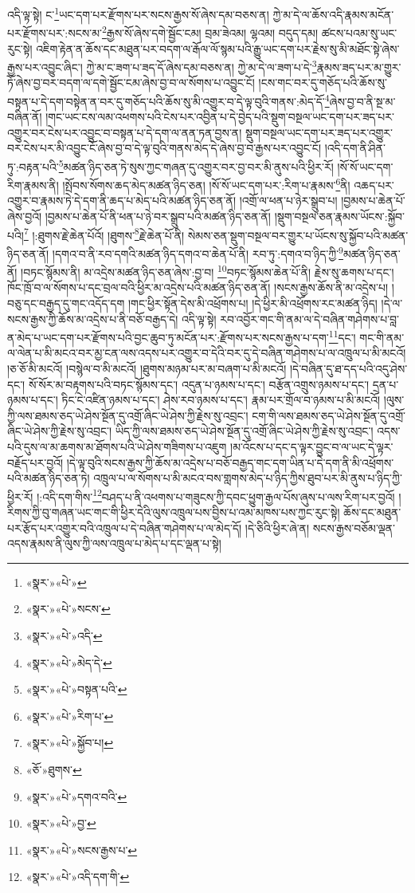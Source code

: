 འདི་ལྟ་སྟེ། ང་\footnote{«སྣར་»«པེ་»}ཡང་དག་པར་རྫོགས་པར་སངས་རྒྱས་སོ་ཞེས་དམ་བཅས་ན། ཀྱེ་མ་དེ་ལ་ཆོས་འདི་རྣམས་མངོན་པར་རྫོགས་པར་:སངས་མ་\footnote{«སྣར་»«པེ་»སངས་}རྒྱས་སོ་ཞེས་དགེ་སྦྱོང་ངམ། བྲམ་ཟེའམ། ལྷའམ། བདུད་དམ། ཚངས་པའམ་སུ་ཡང་རུང་སྟེ། འཇིག་རྟེན་ན་ཆོས་དང་མཐུན་པར་བདག་ལ་རྒོལ་ལོ་སྙམ་པའི་རྒྱུ་ཡང་དག་པར་རྗེས་སུ་མི་མཐོང་སྟེ་ཞེས་རྒྱས་པར་འབྱུང་ཞིང་། ཀྱེ་མ་ང་ཟག་པ་ཟད་དོ་ཞེས་དམ་བཅས་ན། ཀྱེ་མ་དེ་ལ་ཟག་པ་དེ་\footnote{«སྣར་»«པེ་»འདི་}རྣམས་ཟད་པར་མ་གྱུར་ཏོ་ཞེས་བྱ་བར་བདག་ལ་དགེ་སྦྱོང་ངམ་ཞེས་བྱ་བ་ལ་སོགས་པ་འབྱུང་ངོ། །ངས་གང་བར་དུ་གཅོད་པའི་ཆོས་སུ་བསྟན་པ་དེ་དག་བསྟེན་ན་བར་དུ་གཅོད་པའི་ཆོས་སུ་མི་འགྱུར་བ་དེ་ལྟ་བུའི་གནས་:མེད་དོ་\footnote{«སྣར་»«པེ་»མེད་དེ་}ཞེས་བྱ་བ་ནི་སྔ་མ་བཞིན་ནོ། །གང་ཡང་ངས་ལམ་འཕགས་པའི་ངེས་པར་འབྱིན་པ་དེ་བྱེད་པའི་སྡུག་བསྔལ་ཡང་དག་པར་ཟད་པར་འགྱུར་བར་ངེས་པར་འབྱུང་བ་བསྟན་པ་དེ་དག་ལ་ནན་ཏན་བྱས་ན། སྡུག་བསྔལ་ཡང་དག་པར་ཟད་པར་འགྱུར་བར་ངེས་པར་མི་འབྱུང་ངོ་ཞེས་བྱ་བ་དེ་ལྟ་བུའི་གནས་མེད་དེ་ཞེས་བྱ་བ་རྒྱས་པར་འབྱུང་ངོ། །འདི་དག་ནི་ཤིན་ཏུ་:བརྟན་པའི་\footnote{«སྣར་»«པེ་»བསྟན་པའི་}མཚན་ཉིད་ཅན་ཏེ་སུས་ཀྱང་གཞན་དུ་འགྱུར་བར་བྱ་བར་མི་ནུས་པའི་ཕྱིར་རོ། །སོ་སོ་ཡང་དག་རིག་རྣམས་ནི། །སྤོབས་སོགས་ཆད་མེད་མཚན་ཉིད་ཅན། །སོ་སོ་ཡང་དག་པར་:རིག་པ་རྣམས་\footnote{«སྣར་»«པེ་»རིག་པ་}ནི། འཆད་པར་འགྱུར་བ་རྣམས་ཏེ་དེ་དག་ནི་ཆད་པ་མེད་པའི་མཚན་ཉིད་ཅན་ནོ། །འགྲོ་ལ་ཕན་པ་ཉེར་སྒྲུབ་པ། །བྱམས་པ་ཆེན་པོ་ཞེས་བྱའོ། །བྱམས་པ་ཆེན་པོ་ནི་ཕན་པ་ཉེ་བར་སྒྲུབ་པའི་མཚན་ཉིད་ཅན་ནོ། །སྡུག་བསྔལ་ཅན་རྣམས་ཡོངས་:སྐྱོབ་པའི།\footnote{«སྣར་»«པེ་»སྐྱོབ་པ།} །:ཐུགས་རྗེ་ཆེན་པོའོ། །ཐུགས་\footnote{«ཅོ་»ཐུགས་}རྗེ་ཆེན་པོ་ནི། སེམས་ཅན་སྡུག་བསྔལ་བར་གྱུར་པ་ཡོངས་སུ་སྐྱོབ་པའི་མཚན་ཉིད་ཅན་ནོ། །དགའ་བ་ནི་རབ་དགའི་མཚན་ཉིད་དགའ་བ་ཆེན་པོ་ནི། རབ་ཏུ་:དགའ་བ་ཉིད་ཀྱི་\footnote{«སྣར་»«པེ་»དགའ་བའི་}མཚན་ཉིད་ཅན་ནོ། །བཏང་སྙོམས་ནི། མ་འདྲེས་མཚན་ཉིད་ཅན་ཞེས་:བྱ་བ། \footnote{«སྣར་»«པེ་»བྱ་}བཏང་སྙོམས་ཆེན་པོ་ནི། རྗེས་སུ་ཆགས་པ་དང་། ཁོང་ཁྲོ་བ་ལ་སོགས་པ་དང་བྲལ་བའི་ཕྱིར་མ་འདྲེས་པའི་མཚན་ཉིད་ཅན་ནོ། །སངས་རྒྱས་ཆོས་ནི་མ་འདྲེས་པ། །བཅུ་དང་བརྒྱད་དུ་གང་འདོད་དག །གང་ཕྱིར་སྟོན་དེས་མི་འཕྲོགས་པ། །དེ་ཕྱིར་མི་འཕྲོགས་རང་མཚན་ཉིད། །དེ་ལ་སངས་རྒྱས་ཀྱི་ཆོས་མ་འདྲེས་པ་ནི་བཅོ་བརྒྱད་དེ། འདི་ལྟ་སྟེ། རབ་འབྱོར་གང་གི་ནམ་ལ་དེ་བཞིན་གཤེགས་པ་བླ་ན་མེད་པ་ཡང་དག་པར་རྫོགས་པའི་བྱང་ཆུབ་ཏུ་མངོན་པར་:རྫོགས་པར་སངས་རྒྱས་པ་དག་\footnote{«སྣར་»«པེ་»སངས་རྒྱས་པ་}དང་། གང་གི་ནམ་ལ་ལེན་པ་མི་མངའ་བར་མྱ་ངན་ལས་འདས་པར་འགྱུར་བ་དེའི་བར་དུ་དེ་བཞིན་གཤེགས་པ་ལ་འཁྲུལ་པ་མི་མངའོ། །ཅ་ཅོ་མི་མངའོ། །བསྙེལ་བ་མི་མངའོ། །ཐུགས་མཉམ་པར་མ་བཞག་པ་མི་མངའོ། །དེ་བཞིན་དུ་ཐ་དད་པའི་འདུ་ཤེས་དང་། སོ་སོར་མ་བརྟགས་པའི་བཏང་སྙོམས་དང་། འདུན་པ་ཉམས་པ་དང་། བརྩོན་འགྲུས་ཉམས་པ་དང་། དྲན་པ་ཉམས་པ་དང་། ཏིང་ངེ་འཛིན་ཉམས་པ་དང་། ཤེས་རབ་ཉམས་པ་དང་། རྣམ་པར་གྲོལ་བ་ཉམས་པ་མི་མངའོ། །ལུས་ཀྱི་ལས་ཐམས་ཅད་ཡེ་ཤེས་སྔོན་དུ་འགྲོ་ཞིང་ཡེ་ཤེས་ཀྱི་རྗེས་སུ་འབྲང་། ངག་གི་ལས་ཐམས་ཅད་ཡེ་ཤེས་སྔོན་དུ་འགྲོ་ཞིང་ཡེ་ཤེས་ཀྱི་རྗེས་སུ་འབྲང་། ཡིད་ཀྱི་ལས་ཐམས་ཅད་ཡེ་ཤེས་སྔོན་དུ་འགྲོ་ཞིང་ཡེ་ཤེས་ཀྱི་རྗེས་སུ་འབྲང་། འདས་པའི་དུས་ལ་མ་ཆགས་མ་ཐོགས་པའི་ཡེ་ཤེས་གཟིགས་པ་འཇུག །མ་འོངས་པ་དང་ད་ལྟར་བྱུང་བ་ལ་ཡང་དེ་ལྟར་བརྗོད་པར་བྱའོ། །དེ་ལྟ་བུའི་སངས་རྒྱས་ཀྱི་ཆོས་མ་འདྲེས་པ་བཅོ་བརྒྱད་གང་དག་ཡིན་པ་དེ་དག་ནི་མི་འཕྲོགས་པའི་མཚན་ཉིད་ཅན་ཏེ། འཁྲུལ་པ་ལ་སོགས་པ་མི་མངའ་བས་གླགས་མེད་པ་ཉིད་ཀྱིས་ཐུབ་པར་མི་ནུས་པ་ཉིད་ཀྱི་ཕྱིར་རོ། །:འདི་དག་གིས་\footnote{«སྣར་»«པེ་»འདི་དག་གི་}བཤད་པ་ནི་འཕགས་པ་གཟུངས་ཀྱི་དབང་ཕྱུག་རྒྱལ་པོས་ཞུས་པ་ལས་རིག་པར་བྱའོ། །རིགས་ཀྱི་བུ་གཞན་ཡང་གང་གི་ཕྱིར་དེའི་ལུས་འཁྲུལ་པས་བྱིས་པ་འམ་མཁས་པས་ཀྱང་རུང་སྟེ། ཆོས་དང་མཐུན་པར་རྩོད་པར་འགྱུར་བའི་འཁྲུལ་པ་དེ་བཞིན་གཤེགས་པ་ལ་མེད་དོ། །དེ་ཅིའི་ཕྱིར་ཞེ་ན། སངས་རྒྱས་བཅོམ་ལྡན་འདས་རྣམས་ནི་ལུས་ཀྱི་ལས་འཁྲུལ་པ་མེད་པ་དང་ལྡན་པ་སྟེ། 